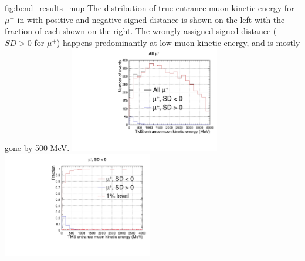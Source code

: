 \begin{dunefigure}{fig:bend_results_mup}
{The distribution of true  entrance muon kinetic energy for $\mu^+$ in  with positive and negative signed distance is shown on the left with the fraction of each shown on the right. The wrongly assigned signed distance ($SD>0$ for $\mu^+$) happens predominantly at low muon kinetic energy, and is mostly gone by 500 MeV.}
\includegraphics[width=0.49\textwidth, clip, trim={0mm 0mm 0mm 10mm}]{graphics/tms/Simulation/Bend/cmetric_signed_distance_KE_muplus.pdf} \includegraphics[width=0.49\textwidth, clip, trim={0mm 0mm 0mm 10mm}]{graphics/tms/Simulation/Bend/cmetric_signed_distance_KE_muplus_ratio.pdf}
\end{dunefigure}

